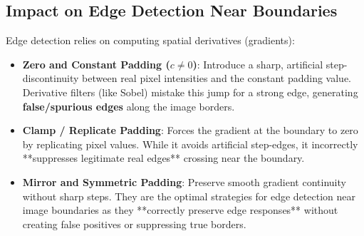 \subsection{Impact on Edge Detection Near Boundaries}
Edge detection relies on computing spatial derivatives (gradients):
\begin{itemize}
    \item \textbf{Zero and Constant Padding ($c \neq 0$)}: Introduce a sharp, artificial step-discontinuity between real pixel intensities and the constant padding value. Derivative filters (like Sobel) mistake this jump for a strong edge, generating \textbf{false/spurious edges} along the image borders.
    \item \textbf{Clamp / Replicate Padding}: Forces the gradient at the boundary to zero by replicating pixel values. While it avoids artificial step-edges, it incorrectly **suppresses legitimate real edges** crossing near the boundary.
    \item \textbf{Mirror and Symmetric Padding}: Preserve smooth gradient continuity without sharp steps. They are the optimal strategies for edge detection near image boundaries as they **correctly preserve edge responses** without creating false positives or suppressing true borders.
\end{itemize}